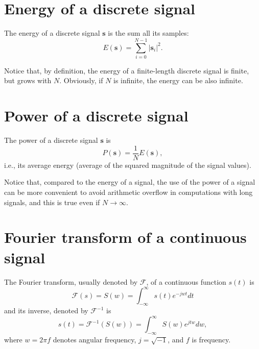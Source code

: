 

\section{Energy of a discrete signal}
\label{sec:energy_signal}

The energy of a discrete signal $\mathbf{s}$ is the sum all its samples:
\begin{equation}
  E(\mathbf{s}) = \sum_{i=0}^{N-1}|\mathbf{s}_i|^2.
\end{equation}

Notice that, by definition, the energy of a finite-length discrete
signal is finite, but grows with $N$. Obviously, if $N$ is infinite,
the energy can be also infinite.


\section{Power of a discrete signal}
\label{sec:power_signal}

The power of a discrete signal $\mathbf{s}$ is
\begin{equation}
  P(\mathbf{s}) = \frac{1}{N}E(\mathbf{s}),
  \label{eq:power_discrete_signal}
\end{equation}
i.e., its average energy (average of the squared magnitude of the
signal values).

Notice that, compared to the energy of a signal, the use of the power
of a signal can be more convenient to avoid arithmetic overflow in
computations with long signals, and this is true even if
$N\rightarrow\infty$.


\section{Fourier transform of a continuous signal}
\label{sec:Fourier_transform}

The Fourier transform, usually denoted by $\mathcal{F}$, of a
continuous function $s(t)$ is
\begin{equation}
  \mathcal{F}(s) = S(w) = \int_{-\infty}^{\infty}s(t)e^{-jwt}dt
  \label{eq:FT}
\end{equation}
and its inverse, denoted by $\mathcal{F}^{-1}$ is
\begin{equation}
  s(t) = \mathcal{F}^{-1}(S(w)) = \int_{-\infty}^{\infty}S(w)e^{jtw}dw,
\end{equation}
where $w=2\pi f$ denotes angular frequency, $j=\sqrt{-1}$, and
$f$ is frequency.

